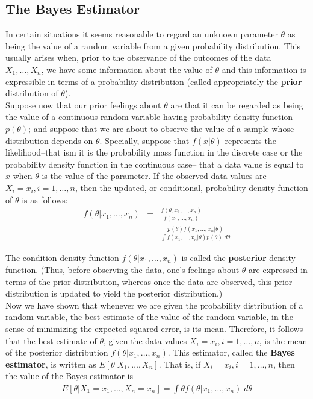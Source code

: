\documentclass[12pt]{article}
\begin{document}
\subsection{The Bayes Estimator}

In certain situations it seems reasonable to regard an unknown parameter $\theta$ as being the value of a random variable from a given probability distribution. This usually arises when, prior to the observance of the outcomes of the data $X_1, \dots, X_n$, we have some information about the value of $\theta$ and this information is expressible in terms of a probability distribution (called appropriately the \textbf{prior} distribution of $\theta$). \\

Suppose now that our prior feelings about $\theta$ are that it can be regarded as being the value of a continuous random variable having probability density function $p(\theta)$; and suppose that we are about to observe the value of a sample whose distribution depends on $\theta$. Specially, suppose that $f(x | \theta)$ represents the likelihood--that ism it is the probability mass function in the discrete case or the probability density function in the continuous case-- that a data value is equal to $x$ when $\theta$ is the value of the parameter. If the observed data values are $X_i = x_i, i =1,\dots,n$, then the updated, or conditional, probability density function of $\theta$ is as follows:
\begin{eqnarray*}
  f(\theta | x_1, \dots, x_n)
  &=& \frac {f(\theta, x_1, \dots, x_n)}{f(x_1, \dots, x_n)} \\
  &=& \frac {p(\theta) f(x_1, \dots, x_n | \theta)}
  {\int f(x_1, \dots, x_n | \theta) p(\theta) \; d \theta}
\end{eqnarray*}

The condition density function $f(\theta | x_1, \dots, x_n)$ is called the \textbf{posterior} density function. (Thus, before observing the data, one's feelings about $\theta$ are expressed in terms of the prior distribution, whereas once the data are observed, this prior distribution is updated to yield the posterior distribution.) \\

Now we have shown that whenever we are given the probability distribution of a random variable, the best estimate of the value of the random variable, in the sense of minimizing the expected squared error, is its mean. Therefore, it follows that the best estimate of $\theta$, given the data values $X_i = x_i, i= 1, \dots, n$, is the mean of the posterior distribution $f(\theta | x_1, \dots, x_n)$. This estimator, called the \textbf{Bayes estimator}, is written as $E[\theta | X_1, \dots, X_n]$. That is, if $X_i = x_i, i = 1, \dots, n$, then the value of the Bayes estimator is
\begin{eqnarray*}
  E[\theta | X_1 = x_1, \dots, X_n = x_n]
  = \int \theta f(\theta | x_1, \dots, x_n) \; d \theta
\end{eqnarray*}
\end{document}
